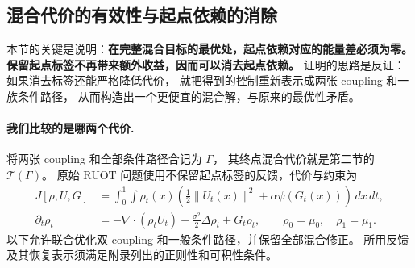 \documentclass[UTF8,a4paper,11pt,fontset=fandol]{ctexart}
\begin{document}
\clearpage
\subsection*{混合代价的有效性与起点依赖的消除}

本节的关键是说明：\textbf{在完整混合目标的最优处，起点依赖对应的能量差必须为零。
保留起点标签不再带来额外收益，因而可以消去起点依赖。}
证明的思路是反证：如果消去标签还能严格降低代价，
就把得到的控制重新表示成两张 coupling 和一族条件路径，
从而构造出一个更便宜的混合解，与原来的最优性矛盾。

\paragraph{我们比较的是哪两个代价.}
将两张 coupling 和全部条件路径合记为 $\Gamma$，
其终点混合代价就是第二节的 $\mathcal T(\Gamma)$。
原始 RUOT 问题使用不保留起点标签的反馈，代价与约束为
\begin{equation}
\begin{aligned}
J[\rho,U,G]
&=\int_0^1\int\rho_t(x)
\left(\frac12\|U_t(x)\|^2+\alpha\psi(G_t(x))\right)\,dx\,dt,\\
\partial_t\rho_t
&=-\nabla\cdot(\rho_tU_t)+\frac{\sigma^2}{2}\Delta\rho_t+G_t\rho_t,
\qquad \rho_0=\mu_0,\quad\rho_1=\mu_1.
\end{aligned}
\label{eq:original-feedback-problem}
\end{equation}
以下允许联合优化双 coupling 和一般条件路径，并保留全部混合修正。
所用反馈及其恢复表示须满足附录列出的正则性和可积性条件。
\end{document}

